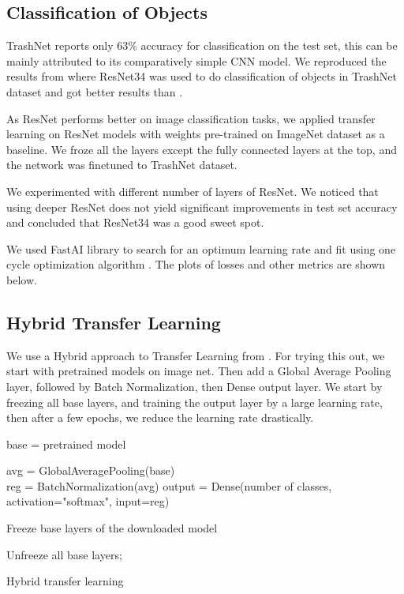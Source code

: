 \documentclass{article}
\begin{document}



\subsection{Classification of Objects}
TrashNet \cite{yang2016classification} reports only 63\% accuracy for classification on the test set, this can be mainly attributed to its comparatively simple CNN model. We reproduced the results from \cite{CollinChing} where ResNet34 was used to do classification of objects in TrashNet dataset  \cite{yang2016classification} and got better results than \cite{CollinChing}. 

As ResNet \cite{he2016deep} performs better on image classification tasks, we applied transfer learning on ResNet models with weights pre-trained on ImageNet dataset as a baseline. We froze all the layers except the fully connected layers at the top, and the network was finetuned to TrashNet dataset. 

We experimented with different number of layers of ResNet. We noticed that using deeper ResNet does not yield significant improvements in test set accuracy and concluded that ResNet34 was a good sweet spot. 

We used FastAI \cite{howard2018fastai} library to search for an optimum learning rate and fit using one cycle optimization algorithm \cite{1CyclePolicy}. The plots of losses and other metrics are shown below.



\subsection{Hybrid Transfer Learning}
\label{HybridTransferLearning}
We use a Hybrid approach to Transfer Learning from \cite{geron2019hands}. For trying this out, we start with pretrained models on image net. Then add a Global Average Pooling layer, followed by Batch Normalization, then Dense output layer. We start by freezing all base layers, and training the output layer by a large learning rate, then after a few epochs, we reduce the learning rate drastically.

\begin{algorithm}[H]
\SetAlgoLined
{}
 base =  pretrained model \;
 
 avg = GlobalAveragePooling(base) \\
 reg = BatchNormalization(avg)
 output = Dense(number of classes, activation="softmax", input=reg)

 Freeze base layers of the downloaded model\;

 
 Unfreeze all base layers; 
 
 \caption{Hybrid transfer learning}
\end{algorithm}
\end{document}

